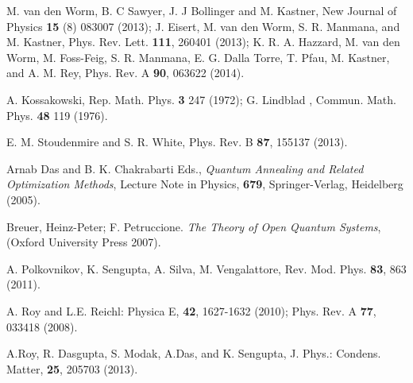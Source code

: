 \documentclass[a4paper,11pt,color]{article}
\renewenvironment{thebibliography}[1]{%
    \begin{oldthebibliography}{#1}%
      \setlength{\parskip}{0ex}%
      \setlength{\itemsep}{0ex}%
  }%
  {%
    \end{oldthebibliography}%
  }
\begin{document}
\begin{thebibliography}{}
M. van den Worm, B. C Sawyer, J. J Bollinger and M. Kastner, New Journal of Physics {\bf 15} (8) 083007 (2013); J. Eisert, M. van den Worm, S. R. Manmana, and M. Kastner, Phys. Rev. Lett. {\bf 111}, 260401 (2013); K. R. A. Hazzard, M. van den Worm, M. Foss-Feig, S. R. Manmana, E. G. Dalla Torre, T. Pfau, M. Kastner, and A. M. Rey, Phys. Rev. A {\bf 90}, 063622 (2014).


A. Kossakowski, Rep. Math. Phys. {\bf 3} 247 (1972); G. Lindblad , Commun. Math. Phys. {\bf 48} 119 (1976).

E. M. Stoudenmire and S. R. White, Phys. Rev. B {\bf 87}, 155137 (2013).

Arnab Das and B. K. Chakrabarti Eds., \textit{Quantum Annealing and Related Optimization Methods}, Lecture Note in Physics, {\bf 679}, Springer-Verlag, Heidelberg (2005).

Breuer, Heinz-Peter; F. Petruccione. \textit{The Theory of Open Quantum Systems}, (Oxford University Press 2007).

A. Polkovnikov, K. Sengupta, A. Silva, M. Vengalattore, Rev. Mod. Phys. \textbf{83}, 863 (2011).

A. Roy and L.E. Reichl:  Physica {E}, {\bf 42}, 1627-1632 (2010); Phys. Rev. {A} {\bf 77}, 033418 (2008).

A.Roy, R. Dasgupta, S. Modak, A.Das, and K. Sengupta, J. Phys.: Condens. Matter, {\bf 25}, 205703 (2013).

\end{thebibliography}
\end{document}
